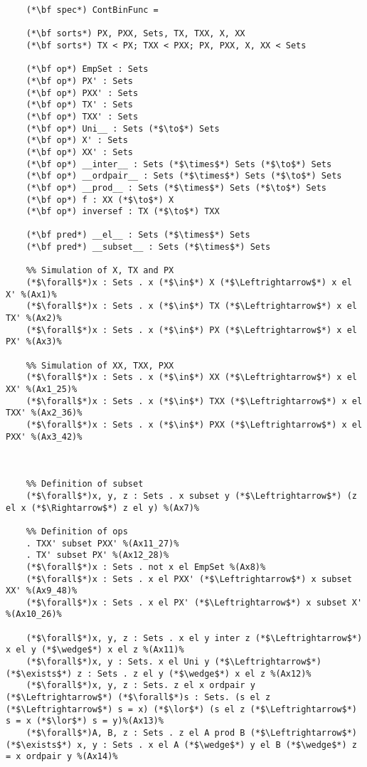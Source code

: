 \documentclass[preview]{standalone}
\begin{document}
\begin{lstlisting}
	(*\bf spec*) ContBinFunc =
	
	(*\bf sorts*) PX, PXX, Sets, TX, TXX, X, XX
	(*\bf sorts*) TX < PX; TXX < PXX; PX, PXX, X, XX < Sets
	
	(*\bf op*) EmpSet : Sets
	(*\bf op*) PX' : Sets
	(*\bf op*) PXX' : Sets
	(*\bf op*) TX' : Sets
	(*\bf op*) TXX' : Sets
	(*\bf op*) Uni__ : Sets (*$\to$*) Sets
	(*\bf op*) X' : Sets
	(*\bf op*) XX' : Sets
	(*\bf op*) __inter__ : Sets (*$\times$*) Sets (*$\to$*) Sets
	(*\bf op*) __ordpair__ : Sets (*$\times$*) Sets (*$\to$*) Sets
	(*\bf op*) __prod__ : Sets (*$\times$*) Sets (*$\to$*) Sets
	(*\bf op*) f : XX (*$\to$*) X
	(*\bf op*) inversef : TX (*$\to$*) TXX
	
	(*\bf pred*) __el__ : Sets (*$\times$*) Sets
	(*\bf pred*) __subset__ : Sets (*$\times$*) Sets
	
	%% Simulation of X, TX and PX
	(*$\forall$*)x : Sets . x (*$\in$*) X (*$\Leftrightarrow$*) x el X' %(Ax1)%
	(*$\forall$*)x : Sets . x (*$\in$*) TX (*$\Leftrightarrow$*) x el TX' %(Ax2)%
	(*$\forall$*)x : Sets . x (*$\in$*) PX (*$\Leftrightarrow$*) x el PX' %(Ax3)%
	
	%% Simulation of XX, TXX, PXX
	(*$\forall$*)x : Sets . x (*$\in$*) XX (*$\Leftrightarrow$*) x el XX' %(Ax1_25)%
	(*$\forall$*)x : Sets . x (*$\in$*) TXX (*$\Leftrightarrow$*) x el TXX' %(Ax2_36)%
	(*$\forall$*)x : Sets . x (*$\in$*) PXX (*$\Leftrightarrow$*) x el PXX' %(Ax3_42)%
	
	
	
	%% Definition of subset
	(*$\forall$*)x, y, z : Sets . x subset y (*$\Leftrightarrow$*) (z el x (*$\Rightarrow$*) z el y) %(Ax7)%
	
	%% Definition of ops
	. TXX' subset PXX' %(Ax11_27)%
	. TX' subset PX' %(Ax12_28)%
	(*$\forall$*)x : Sets . not x el EmpSet %(Ax8)%
	(*$\forall$*)x : Sets . x el PXX' (*$\Leftrightarrow$*) x subset XX' %(Ax9_48)%
	(*$\forall$*)x : Sets . x el PX' (*$\Leftrightarrow$*) x subset X' %(Ax10_26)%
	
	(*$\forall$*)x, y, z : Sets . x el y inter z (*$\Leftrightarrow$*) x el y (*$\wedge$*) x el z %(Ax11)%
	(*$\forall$*)x, y : Sets. x el Uni y (*$\Leftrightarrow$*) (*$\exists$*) z : Sets . z el y (*$\wedge$*) x el z %(Ax12)%
	(*$\forall$*)x, y, z : Sets. z el x ordpair y (*$\Leftrightarrow$*) (*$\forall$*)s : Sets. (s el z (*$\Leftrightarrow$*) s = x) (*$\lor$*) (s el z (*$\Leftrightarrow$*) s = x (*$\lor$*) s = y)%(Ax13)%
	(*$\forall$*)A, B, z : Sets . z el A prod B (*$\Leftrightarrow$*) (*$\exists$*) x, y : Sets . x el A (*$\wedge$*) y el B (*$\wedge$*) z = x ordpair y %(Ax14)%
	

\end{lstlisting}
\end{document}
